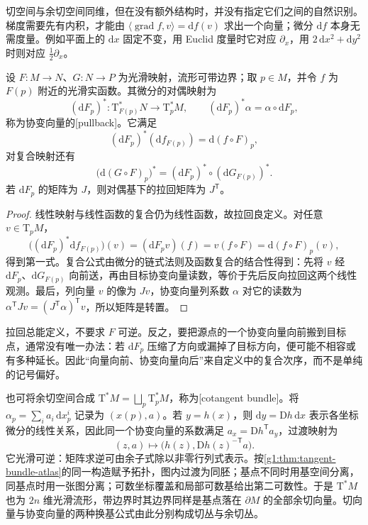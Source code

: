 \ProseParagraphBreak

切空间与余切空间同维，但在没有额外结构时，并没有指定它们之间的自然识别。梯度需要先有内积，才能由 \(\langle\operatorname{grad}f,v\rangle=\mathrm{d}f(v)\) 求出一个向量；微分 \(\mathrm{d}f\) 本身无需度量。例如平面上的 \(\mathrm{d}x\) 固定不变，用 Euclid 度量时它对应 \(\partial_x\)，用 \(2\,\mathrm{d}x^2+\mathrm{d}y^2\) 时则对应 \(\frac12\partial_x\)。

\begin{proposition}
	\label{g1:prop:covector-pullback}
	设 \(F:M\to N\)、\(G:N\to P\) 为光滑映射，流形可带边界；取 \(p\in M\)，并令 \(f\) 为 \(F(p)\) 附近的光滑实函数。其微分的对偶映射为
	\[
		(\mathrm{d}F_p)^*:\mathrm{T}_{F(p)}^*N\longrightarrow \mathrm{T}_p^*M,\qquad
		(\mathrm{d}F_p)^*\alpha=\alpha\circ\mathrm{d}F_p,
	\]
	称为协变向量的[pullback]。它满足
	\[
		(\mathrm{d}F_p)^*(\mathrm{d}f_{F(p)})=\mathrm{d}(f\circ F)_p,
	\]
	对复合映射还有
	\[
		\bigl(\mathrm{d}(G\circ F)_p\bigr)^*
		=(\mathrm{d}F_p)^*\circ(\mathrm{d}G_{F(p)})^*.
	\]
	若 \(\mathrm{d}F_p\) 的矩阵为 \(J\)，则对偶基下的拉回矩阵为 \(J^{\mathsf T}\)。
\end{proposition}
\begin{proof}
	线性映射与线性函数的复合仍为线性函数，故拉回良定义。对任意 \(v\in \mathrm{T}_pM\)，
	\[
		\bigl((\mathrm{d}F_p)^*\mathrm{d}f_{F(p)}\bigr)(v)
		=(\mathrm{d}F_pv)(f)=v(f\circ F)
		=\mathrm{d}(f\circ F)_p(v),
	\]
	得到第一式。复合公式由微分的链式法则及函数复合的结合性得到：先将 \(v\) 经 \(\mathrm{d}F_p\)、\(\mathrm{d}G_{F(p)}\) 向前送，再由目标协变向量读数，等价于先后反向拉回这两个线性观测。最后，列向量 \(v\) 的像为 \(Jv\)，协变向量列系数 \(\alpha\) 对它的读数为 \(\alpha^{\mathsf T}Jv=(J^{\mathsf T}\alpha)^{\mathsf T}v\)，所以矩阵是转置。
\end{proof}

拉回总能定义，不要求 \(F\) 可逆。反之，要把源点的一个协变向量向前搬到目标点，通常没有唯一办法：若 \(\mathrm{d}F_p\) 压缩了方向或漏掉了目标方向，便可能不相容或有多种延长。因此“向量向前、协变向量向后”来自定义中的复合次序，而不是单纯的记号偏好。

\ProseParagraphBreak

也可将余切空间合成 \(\mathrm{T}^*M=\bigsqcup_p\mathrm{T}_p^*M\)，称为[cotangent bundle]。将 \(\alpha_p=\sum_i a_i\,\mathrm{d}x^i_p\) 记录为 \((x(p),a)\)。若 \(y=h(x)\)，则 \(\mathrm{d}y=\mathrm{D}h\,\mathrm{d}x\) 表示各坐标微分的线性关系，因此同一个协变向量的系数满足 \(a_x=\mathrm{D}h^{\mathsf T}a_y\)，过渡映射为
\[
	(z,a)\longmapsto\bigl(h(z),\mathrm{D}h(z)^{-{\mathsf T}}a\bigr).
\]
它光滑可逆：矩阵求逆可由余子式除以非零行列式表示。按\cref{g1:thm:tangent-bundle-atlas}的同一构造赋予拓扑，图内过渡为同胚；基点不同时用基空间分离，同基点时用一张图分离；可数坐标覆盖和局部可数基给出第二可数性。于是 \(\mathrm{T}^*M\) 也为 \(2n\) 维光滑流形，带边界时其边界同样是基点落在 \(\partial M\) 的全部余切向量。切向量与协变向量的两种换基公式由此分别构成切丛与余切丛。

